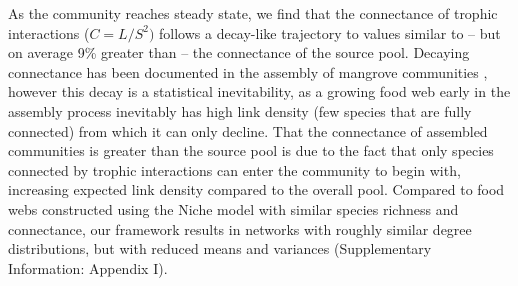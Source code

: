 \documentclass[9pt,twocolumn,twoside]{pnas-new}
\newcommand{\rr}[1]{{\rm #1}}
\begin{document}
As the community reaches steady state, we find that the connectance of trophic interactions ($C=L/S^2)$ follows a decay-like trajectory to values similar to -- but on average 9\% greater than -- the connectance of the source pool.
Decaying connectance has been documented in the assembly of mangrove communities \cite{Piechnik2008}, however this decay is a statistical inevitability, as a growing food web early in the assembly process inevitably has high link density (few species that are fully connected) from which it can only decline.
That the connectance of assembled communities is greater than the source pool is due to the fact that only species connected by trophic interactions can enter the community to begin with, increasing expected link density compared to the overall pool.
Compared to food webs constructed using the Niche model with similar species richness and connectance, our framework results in networks with roughly similar degree distributions, but with reduced means and variances (Supplementary Information: Appendix I).

% 
\end{document}
